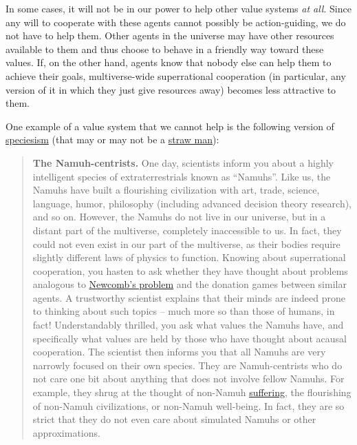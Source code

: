 In some cases, it will not be in our power to help other value systems
\emph{at all}. Since any will to cooperate with these agents cannot
possibly be action-guiding, we do not have to help them. Other agents in
the universe may have other resources available to them and thus choose
to behave in a friendly way toward these values. If, on the other hand,
agents know that nobody else can help them to achieve their goals,
multiverse-wide superrational cooperation (in particular, any version of
it in which they just give resources away) becomes less attractive to
them.

One example of a value system that we cannot help is the following
version of
\href{https://en.wikipedia.org/wiki/Speciesism}{speciesism} (that
may or may not be a
\href{https://en.wikipedia.org/wiki/Straw_man}{straw man}):

\begin{quote}
\textbf{The Namuh-centrists.} One day, scientists inform you about a
highly intelligent species of extraterrestrials known as ``Namuhs''.
Like us, the Namuhs have built a flourishing civilization with art,
trade, science, language, humor, philosophy (including advanced decision
theory research), and so on. However, the Namuhs do not live in our
universe, but in a distant part of the multiverse, completely
inaccessible to us. In fact, they could not even exist in our part of
the multiverse, as their bodies require slightly different laws of
physics to function. Knowing about superrational cooperation, you hasten
to ask whether they have thought about problems analogous to
\href{https://en.wikipedia.org/wiki/Newcomb\%27s_paradox}{Newcomb's
problem} and the donation games between similar agents. A trustworthy
scientist explains that their minds are indeed prone to thinking about
such topics -- much more so than those of humans, in fact!
Understandably thrilled, you ask what values the Namuhs have, and
specifically what values are held by those who have thought about
acausal cooperation. The scientist then informs you that all Namuhs are
very narrowly focused on their own species. They are Namuh-centrists who
do not care one bit about anything that does not involve fellow Namuhs.
For example, they shrug at the thought of non-Namuh
\href{https://foundational-research.org/the-case-for-suffering-focused-ethics/}{suffering},
the flourishing of non-Namuh civilizations, or non-Namuh well-being. In
fact, they are so strict that they do not even care about simulated
Namuhs or other approximations.
\end{quote}

